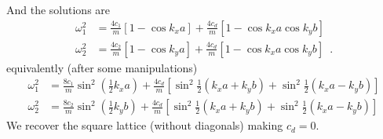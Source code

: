 \documentclass[12pt,letterpaper]{article}
\begin{document}
And the solutions are
\begin{align*}
\omega_1^2 &= \frac{4c_1}{m}\left[1 - \cos k_x a \right] + \frac{4 c_d}{m}\left[1 - \cos k_x a \cos k_y b \right]\\
\omega_2^2 &= \frac{4c_2}{m}\left[1 - \cos k_y a \right] + \frac{4 c_d}{m}\left[1 - \cos k_x a \cos k_y b \right] \enspace .
\end{align*}
equivalently (after some manipulations)
\begin{align}
\omega_1^2 &= \frac{8c_1}{m} \sin^2 \left(\frac{1}{2}k_x a\right)  + \frac{4c_d}{m} \left[\sin^2 \frac{1}{2}\left(k_x a + k_y b\right) + \sin^2 \frac{1}{2}\left(k_x a - k_y b\right)\right] \\
\omega_2^2 &= \frac{8c_2}{m} \sin^2 \left(\frac{1}{2}k_y b\right)  + \frac{4c_d}{m} \left[\sin^2 \frac{1}{2}\left(k_x a + k_y b\right) + \sin^2 \frac{1}{2}\left(k_x a - k_y b\right)\right]  
\end{align}
We recover the square lattice (without diagonals) making $c_d=0$.
\end{document}
